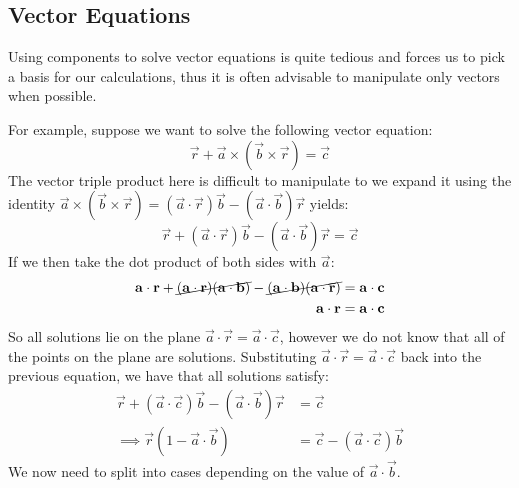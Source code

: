 \documentclass[../main.tex]{subfiles}
\begin{document}
\subsection{Vector Equations}
Using components to solve vector equations is quite tedious and forces us to pick a basis for our calculations, thus it is often advisable to manipulate only vectors when possible.

For example, suppose we want to solve the following vector equation:
\begin{equation}
  \vec{r} + \vec{a} \times (\vec{b} \times \vec{r}) = \vec{c} \label{vectorEquationAst} \tag{$\ast$}
\end{equation}
The vector triple product here is difficult to manipulate to we expand it using the identity $\vec{a} \times (\vec{b} \times \vec{r}) = (\vec{a} \cdot \vec{r}) \vec{b} - (\vec{a} \cdot \vec{b})\vec{r}$ yields:
\[
  \vec{r} + (\vec{a} \cdot \vec{r})\vec{b} - (\vec{a} \cdot \vec{b})\vec{r} = \vec{c}
\]
If we then take the dot product of both sides with $\vec{a}$:
\begin{align*}
  \vec{a} \cdot \vec{r} + \cancel{(\vec{a} \cdot \vec{r})(\vec{a} \cdot \vec{b})} - \cancel{(\vec{a} \cdot \vec{b})(\vec{a} \cdot \vec{r})} &= \vec{a} \cdot \vec{c} \\
  \vec{a} \cdot \vec{r} &= \vec{a} \cdot \vec{c}
\end{align*}
So all solutions lie on the plane $\vec{a} \cdot \vec{r} = \vec{a} \cdot \vec{c}$, however we do not know that all of the points on the plane are solutions.
Substituting $\vec{a} \cdot \vec{r} = \vec{a} \cdot \vec{c}$ back into the previous equation, we have that all solutions satisfy:
\begin{align}
  \vec{r} + (\vec{a} \cdot \vec{c})\vec{b} - (\vec{a} \cdot \vec{b})\vec{r} &= \vec{c} \nonumber \\
  \implies \vec{r}(1 - \vec{a} \cdot \vec{b}) &= \vec{c} - (\vec{a} \cdot \vec{c}) \vec{b} \label{vectorEquationDag} \tag{$\dag$}
\end{align}
We now need to split into cases depending on the value of $\vec{a} \cdot \vec{b}$.
\end{document}
